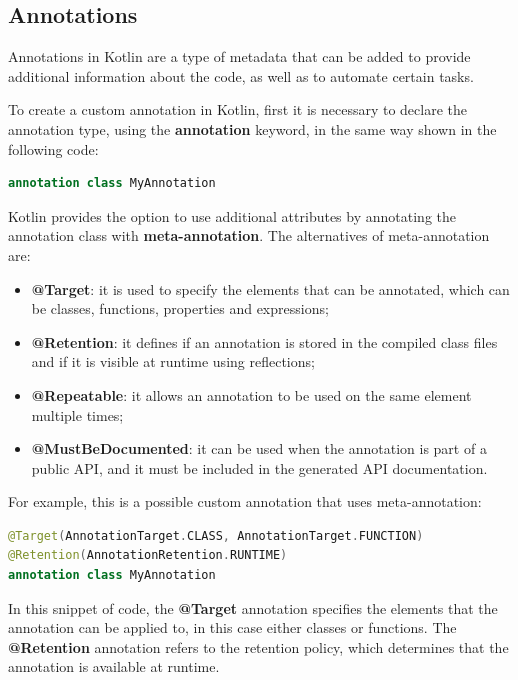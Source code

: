 \subsection{Annotations}\label{section:annotation}
Annotations \cite{annotation_documentation} in Kotlin are a type of metadata that can be added to provide additional information about the code, as well as to automate certain tasks.

To create a custom annotation in Kotlin, first it is necessary to declare the annotation type, using the \textbf{annotation} keyword, in the same way shown in the following code:
\begin{lstlisting}[caption={Example of creation of a custom annotation in Kotlin}, language=Kotlin, captionpos=b, label={code:kotlin_annotations_creation}]
annotation class MyAnnotation
\end{lstlisting}

Kotlin provides the option to use additional attributes by annotating the annotation class with \textbf{meta-annotation}. The alternatives of meta-annotation are:
\begin{itemize}
    \item \textbf{@Target}: it is used to specify the elements that can be annotated, which can be classes, functions, properties and expressions;
    \item \textbf{@Retention}: it defines if an annotation is stored in the compiled class files and if it is visible at runtime using reflections;
    \item \textbf{@Repeatable}: it allows an annotation to be used on the same element multiple times;
    \item \textbf{@MustBeDocumented}: it can be used when the annotation is part of a public API, and it must be included in the generated API documentation.
\end{itemize}

For example, this is a possible custom annotation that uses meta-annotation:
\begin{lstlisting}[caption={Example of custom annotation in Kotlin}, language=Kotlin, captionpos=b, label={code:kotlin_annotations_customization}]
@Target(AnnotationTarget.CLASS, AnnotationTarget.FUNCTION)
@Retention(AnnotationRetention.RUNTIME)
annotation class MyAnnotation
\end{lstlisting}
In this snippet of code, the \textbf{@Target} annotation specifies the elements that the annotation can be applied to, in this case either classes or functions. The \textbf{@Retention} annotation refers to the retention policy, which determines that the annotation is available at runtime.

